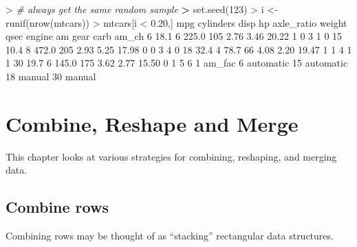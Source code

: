 \documentclass[
]{book}
\newenvironment{Shaded}{\begin{snugshade}}{\end{snugshade}}
\newcommand{\CommentTok}[1]{\textcolor[rgb]{0.56,0.35,0.01}{\textit{#1}}}
\newcommand{\DecValTok}[1]{\textcolor[rgb]{0.00,0.00,0.81}{#1}}
\newcommand{\ErrorTok}[1]{\textcolor[rgb]{0.64,0.00,0.00}{\textbf{#1}}}
\newcommand{\FloatTok}[1]{\textcolor[rgb]{0.00,0.00,0.81}{#1}}
\newcommand{\FunctionTok}[1]{\textcolor[rgb]{0.00,0.00,0.00}{#1}}
\newcommand{\NormalTok}[1]{#1}
\newcommand{\OtherTok}[1]{\textcolor[rgb]{0.56,0.35,0.01}{#1}}
\newcommand{\SpecialCharTok}[1]{\textcolor[rgb]{0.00,0.00,0.00}{#1}}
\begin{document}
\begin{Shaded}
\begin{Highlighting}[]
\SpecialCharTok{\textgreater{}} \CommentTok{\# always get the same random sample}
\ErrorTok{\textgreater{}} \FunctionTok{set.seed}\NormalTok{(}\DecValTok{123}\NormalTok{)}
\SpecialCharTok{\textgreater{}}\NormalTok{ i }\OtherTok{\textless{}{-}} \FunctionTok{runif}\NormalTok{(}\FunctionTok{nrow}\NormalTok{(mtcars))}
\SpecialCharTok{\textgreater{}}\NormalTok{ mtcars[i }\SpecialCharTok{\textless{}} \FloatTok{0.20}\NormalTok{,]}
\NormalTok{    mpg cylinders  disp  hp axle\_ratio weight  qsec engine am gear carb am\_ch}
\DecValTok{6}  \FloatTok{18.1}         \DecValTok{6} \FloatTok{225.0} \DecValTok{105}       \FloatTok{2.76}   \FloatTok{3.46} \FloatTok{20.22}      \DecValTok{1}  \DecValTok{0}    \DecValTok{3}    \DecValTok{1}     \DecValTok{0}
\DecValTok{15} \FloatTok{10.4}         \DecValTok{8} \FloatTok{472.0} \DecValTok{205}       \FloatTok{2.93}   \FloatTok{5.25} \FloatTok{17.98}      \DecValTok{0}  \DecValTok{0}    \DecValTok{3}    \DecValTok{4}     \DecValTok{0}
\DecValTok{18} \FloatTok{32.4}         \DecValTok{4}  \FloatTok{78.7}  \DecValTok{66}       \FloatTok{4.08}   \FloatTok{2.20} \FloatTok{19.47}      \DecValTok{1}  \DecValTok{1}    \DecValTok{4}    \DecValTok{1}     \DecValTok{1}
\DecValTok{30} \FloatTok{19.7}         \DecValTok{6} \FloatTok{145.0} \DecValTok{175}       \FloatTok{3.62}   \FloatTok{2.77} \FloatTok{15.50}      \DecValTok{0}  \DecValTok{1}    \DecValTok{5}    \DecValTok{6}     \DecValTok{1}
\NormalTok{      am\_fac}
\DecValTok{6}\NormalTok{  automatic}
\DecValTok{15}\NormalTok{ automatic}
\DecValTok{18}\NormalTok{    manual}
\DecValTok{30}\NormalTok{    manual}
\end{Highlighting}
\end{Shaded}

\hypertarget{combine-reshape-and-merge}{%
\chapter{Combine, Reshape and Merge}\label{combine-reshape-and-merge}}

This chapter looks at various strategies for combining, reshaping, and merging data.

\hypertarget{combine-rows}{%
\section{Combine rows}\label{combine-rows}}

Combining rows may be thought of as ``stacking'' rectangular data structures.
\end{document}
